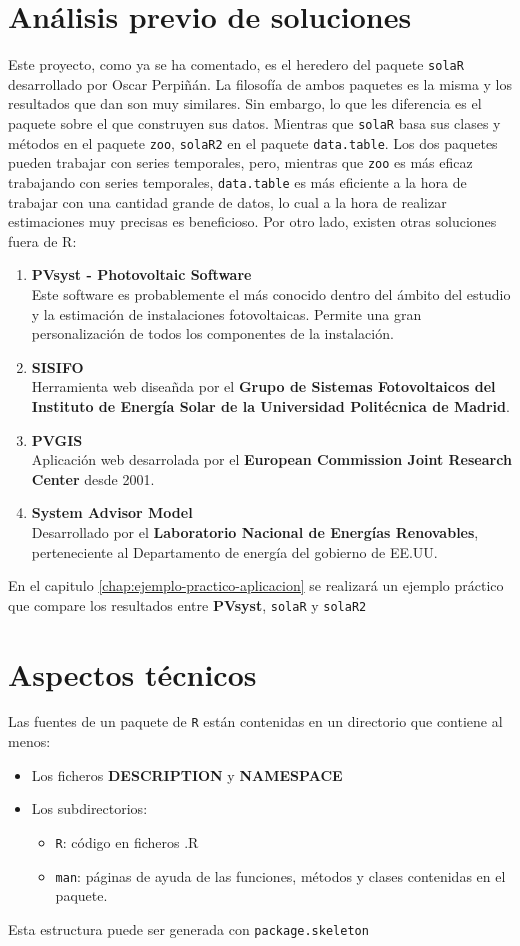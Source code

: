 \section{Análisis previo de soluciones}
\label{sec:org8201672}
Este proyecto, como ya se ha comentado, es el heredero del paquete \texttt{solaR} desarrollado por Oscar Perpiñán. La filosofía de ambos paquetes es la misma y los resultados que dan son muy similares. Sin embargo, lo que les diferencia es el paquete sobre el que construyen sus datos.
Mientras que \texttt{solaR} basa sus clases y métodos en el paquete \texttt{zoo}, \texttt{solaR2} en el paquete \texttt{data.table}. Los dos paquetes pueden trabajar con series temporales, pero, mientras que \texttt{zoo} es más eficaz trabajando con series temporales, \texttt{data.table} es más eficiente a la hora de trabajar con una cantidad grande de datos, lo cual a la hora de realizar estimaciones muy precisas es beneficioso.
Por otro lado, existen otras soluciones fuera de R:
\begin{enumerate}
\item \textbf{PVsyst - Photovoltaic Software}\\[0pt]
Este software es probablemente el más conocido dentro del ámbito del estudio y la estimación de instalaciones fotovoltaicas. Permite una gran personalización de todos los componentes de la instalación.
\item \textbf{SISIFO}\\[0pt]
Herramienta web diseañda por el \textbf{Grupo de Sistemas Fotovoltaicos del Instituto de Energía Solar de la Universidad Politécnica de Madrid}.
\item \textbf{PVGIS}\\[0pt]
Aplicación web desarrolada por el \textbf{European Commission Joint Research Center} desde 2001.
\item \textbf{System Advisor Model}\\[0pt]
Desarrollado por el \textbf{Laboratorio Nacional de Energías Renovables}, perteneciente al Departamento de energía del gobierno de EE.UU.
\end{enumerate}
En el capitulo \ref{chap:ejemplo-practico-aplicacion} se realizará un ejemplo práctico que compare los resultados entre \textbf{PVsyst}, \texttt{solaR} y \texttt{solaR2}
\section{Aspectos técnicos}
\label{sec:org17b0ed9}
\label{sec:aspectos-tecnicos}
Las fuentes de un paquete de \texttt{R} están contenidas en un directorio que contiene al menos:
\begin{itemize}
\item Los ficheros \textbf{DESCRIPTION} y \textbf{NAMESPACE}
\item Los subdirectorios:
\begin{itemize}
\item \texttt{R}: código en ficheros .R
\item \texttt{man}: páginas de ayuda de las funciones, métodos y clases contenidas en el paquete.
\end{itemize}
\end{itemize}
Esta estructura puede ser generada con \texttt{package.skeleton}

